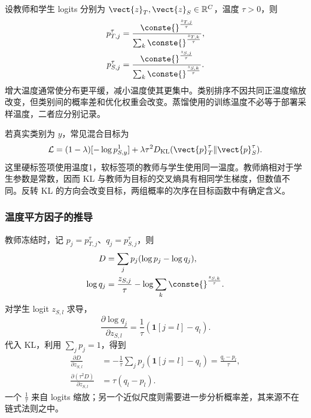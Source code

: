 \documentclass[../textbook.tex]{subfiles}
\begin{document}
设教师和学生 logits 分别为 $\vect{z}_T,\vect{z}_S\in\mathbb R^C$，温度 $\tau>0$，则
\begin{equation}
\begin{aligned}
 p_{T,j}^\tau &= \frac{\conste{}^{\frac{z_{T,j}}{\tau}}}{\sum_k \conste{}^{\frac{z_{T,k}}{\tau}}}, \\
 p_{S,j}^\tau &= \frac{\conste{}^{\frac{z_{S,j}}{\tau}}}{\sum_k \conste{}^{\frac{z_{S,k}}{\tau}}}.
\end{aligned}
\end{equation}
增大温度通常使分布更平缓，减小温度使其更集中。类别排序不因共同正温度缩放改变，但类别间的概率差和优化权重会改变。蒸馏使用的训练温度不必等于部署采样温度，二者应分别记录。

若真实类别为 $y$，常见混合目标为
\begin{equation}
 \mathcal L=(1-\lambda)[-\log p_{S,y}^{1}]
 +\lambda\tau^2D_{\mathrm{KL}}(\vect{p}_T^\tau\Vert \vect{p}_S^\tau).
 \label{eq:compress-distill}
\end{equation}
这里硬标签项使用温度1，软标签项的教师与学生使用同一温度。教师熵相对于学生参数是常数，因而 KL 与教师为目标的交叉熵具有相同学生梯度，但数值不同。反转 KL 的方向会改变目标，两组概率的次序在目标函数中有确定含义。

\subsubsection{温度平方因子的推导}
教师冻结时，记 $p_j=p_{T,j}^\tau$、$q_j=p_{S,j}^\tau$，则
\begin{equation}
\begin{aligned}
 D &= \sum_jp_j(\log p_j-\log q_j), \\
 \log q_j &= \frac{z_{S,j}}\tau-\log\sum_k \conste{}^{\frac{z_{S,k}}{\tau}}.
\end{aligned}
\end{equation}
对学生 logit $z_{S,l}$ 求导，
\begin{equation}
 \frac{\partial\log q_j}{\partial z_{S,l}}
 =\frac1\tau(\mathbf1[j=l]-q_l).
\end{equation}
代入 KL，利用 $\sum_jp_j=1$，得到
\begin{align}
 \frac{\partial D}{\partial z_{S,l}}
 &=-\frac1\tau\sum_jp_j(\mathbf1[j=l]-q_l)
 =\frac{q_l-p_l}{\tau},\\
 \frac{\partial(\tau^2D)}{\partial z_{S,l}}
 &=\tau(q_l-p_l).
 \label{eq:compress-kdgradient}
\end{align}
一个 $\frac{1}{\tau}$ 来自 logits 缩放；另一个近似尺度则需要进一步分析概率差，其来源不在链式法则之中。
\end{document}
